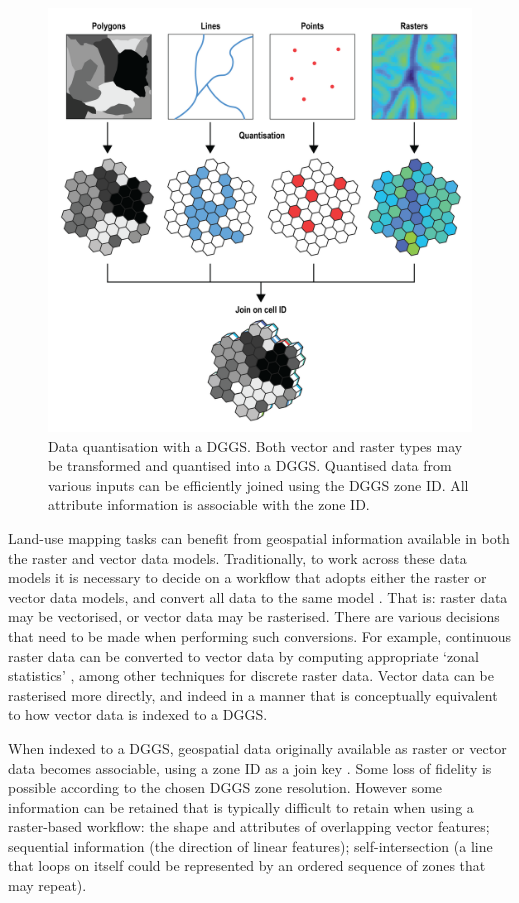 \documentclass[]{interact}
\theoremstyle{plain}%
\theoremstyle{definition}
\theoremstyle{remark}
\begin{document}
\begin{figure}[t]
    \centering
    \includegraphics[width=0.65\linewidth]{images/DGGS_lu-01.png}
    \caption{Data quantisation with a \ac{DGGS}. Both vector and raster types may be transformed and quantised into a \ac{DGGS}. Quantised data from various inputs can be efficiently joined using the \ac{DGGS} zone ID. All attribute information is associable with the zone ID.}
    \label{fig:Interoperable}
\end{figure}

Land-use mapping tasks can benefit from geospatial information available in both the raster and vector data models. Traditionally, to work across these data models it is necessary to decide on a workflow that adopts either the raster or vector data models, and convert all data to the same model \citep{winter1998bridging,wade2003comparison}. That is: raster data may be vectorised, or vector data may be rasterised. There are various decisions that need to be made when performing such conversions. For example, continuous raster data can be converted to vector data by computing appropriate `zonal statistics' \citep{zhang2015efficient,singla2018distributed}, among other techniques for discrete raster data. Vector data can be rasterised more directly, and indeed in a manner that is conceptually equivalent to how vector data is indexed to a \ac{DGGS}.

When indexed to a \ac{DGGS}, geospatial data originally available as raster or vector data becomes associable, using a zone ID as a join key \citep{dutton1989modelling,sahr2019central}. Some loss of fidelity is possible according to the chosen \ac{DGGS} zone resolution. However some information can be retained that is typically difficult to retain when using a raster-based workflow: the shape and attributes of overlapping vector features; sequential information (the direction of linear features); self-intersection (a line that loops on itself could be represented by an ordered sequence of zones that may repeat).   
\end{document}
